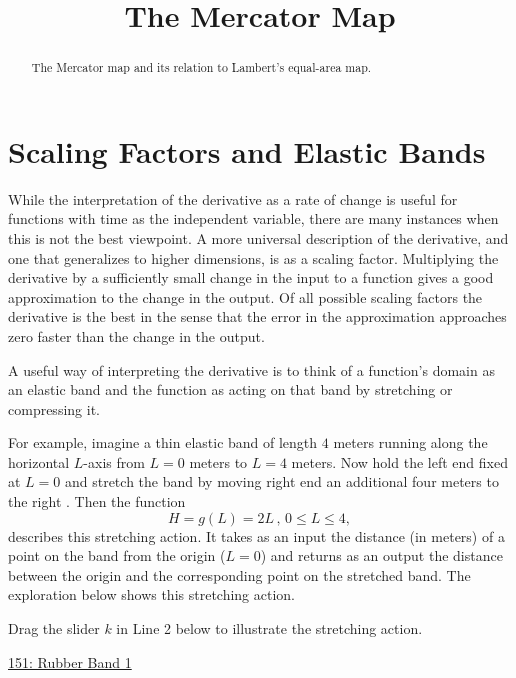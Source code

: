 \documentclass{ximera}
\title{The Mercator Map}
\begin{document}
\begin{abstract}
The Mercator map and its relation to Lambert's equal-area map.
\end{abstract}
\maketitle

\section{Scaling Factors and Elastic Bands}
While the interpretation of the derivative as a rate of change is useful for functions with time as the independent variable, there are many instances when this is not the best viewpoint. A more universal description of the derivative, and one that generalizes to higher dimensions, is as a scaling factor. Multiplying the derivative by a sufficiently small change in the input to a function gives a good approximation to the change in the output. Of all possible scaling factors the derivative is the best in the sense that the error in the approximation approaches zero faster than the change in the output.

A useful way of interpreting the derivative is to think of a function's domain as an elastic band and the function as acting on that band by stretching or compressing it.

For example, imagine a thin elastic band of length $4$ meters running along the horizontal $L$-axis from $L=0$ meters to $L=4$ meters.  Now hold the left end fixed at $L=0$ and stretch the band by moving right end an additional four meters to the right . Then the function
\[
      H = g(L) = 2L \, , \, 0\leq L \leq 4 ,
\]
describes this stretching action. It takes as an input the distance (in meters) of a point on the band from the origin ($L=0$) and returns as an output the distance between the origin and the corresponding point on the stretched band. The exploration below shows this stretching action.

\begin{exploration} \label{Ex:98f3rgafgbb}
Drag the slider $k$ in Line 2 below to illustrate the stretching action.

\begin{onlineOnly}
    \begin{center}
\end{center}
\end{onlineOnly}

\href{https://www.desmos.com/calculator/qejivz36ui}{151: Rubber Band 1}

\end{exploration}
\end{document}
